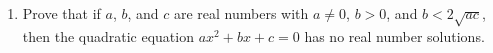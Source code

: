 \begin{enumerate}
\begin{enumerate}
\item Prove that if $a$, $b$, and $c$ are real numbers with $a \ne 0$, $b > 0$, and $b < 2 \sqrt{ac}$, then the quadratic equation $ax^2 + bx + c = 0$ has no real number solutions.

\end{enumerate}

%




\end{enumerate}


